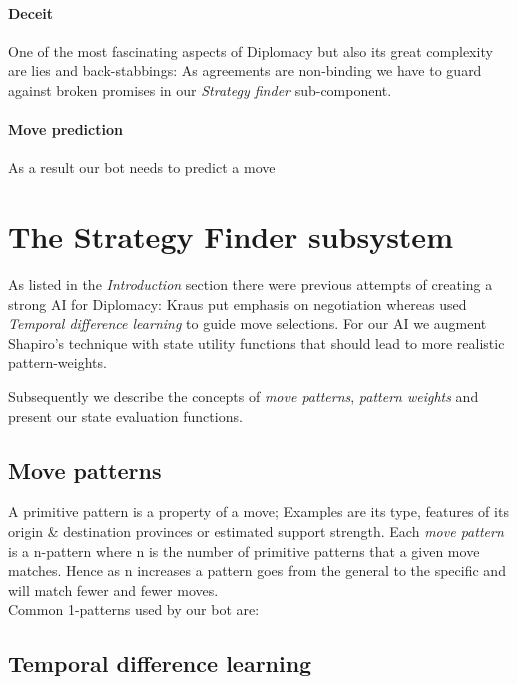 \documentclass[pdftex,12pt,a4paper]{report}
\begin{document}
\paragraph{Deceit}
One of the most fascinating aspects of Diplomacy but also its great
complexity are lies and back-stabbings: As agreements are non-binding
we have to guard against broken promises in our \textit{Strategy finder}
sub-component. 

\paragraph{Move prediction}
As a result our bot needs to predict a move 

\section{The Strategy Finder subsystem}

As listed in the \textit{Introduction} section there were previous
attempts of creating a strong AI for Diplomacy: Kraus \cite{Kraus95}
put emphasis on negotiation whereas \cite{Shapiro02} used
\textit{Temporal difference learning} to guide move selections. For
our AI we augment Shapiro's technique with state utility functions
that should lead to more realistic pattern-weights.

Subsequently we describe the concepts of \textit{move patterns},
\textit{pattern weights} and present our state evaluation functions.

\subsection{Move patterns}

A primitive pattern is a property of a move; Examples are its type,
features of its origin \& destination provinces or estimated support
strength. Each \textit{move pattern} is a n-pattern where n is the
number of primitive patterns that a given move matches. Hence as n
increases a pattern goes from the general to the specific and will
match fewer and fewer moves. \\

Common 1-patterns used by our bot are:



\subsection{Temporal difference learning}
\end{document}
